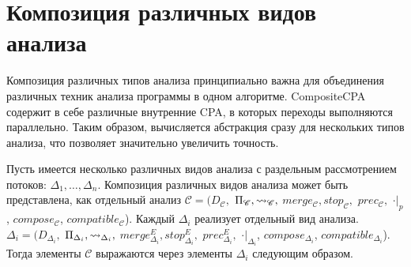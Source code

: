 \section{Композиция различных видов анализа}
\label{sect_ccc_analysis}

Композиция различных типов анализа принципиально важна для объединения различных техник анализа программы в одном алгоритме.
CompositeCPA содержит в себе различные внутренние CPA, в которых переходы выполняются параллельно.
Таким образом, вычисляется абстракция сразу для нескольких типов анализа, что позволяет значительно увеличить точность.

Пусть имеется несколько различных видов анализа с раздельным рассмотрением потоков: $\Delta_1, \dots, \Delta_n$. 
Композиция различных видов анализа может быть представлена, как отдельный анализ $\mathscr{C}=(D_{\mathscr{C}},$ $\Pi_{\mathscr{C}}, \leadsto_{\mathscr{C}},$ $merge_{\mathscr{C}}, stop_{\mathscr{C}},$ $prec_{\mathscr{C}},$ $\cdot|_p$, $compose_{\mathscr{C}}$, $compatible_{\mathscr{C}}$).
Каждый $\Delta_i$ реализует отдельный вид анализа. 
$\Delta_i=(D_{\Delta_i},$ $\Pi_{\Delta_i}, \leadsto_{\Delta_i},$ $merge^E_{\Delta_i}, stop^E_{\Delta_i},$ $prec^E_{\Delta_i},$ $\cdot|_{\Delta_i}$, $compose_{\Delta_i}$, $compatible_{\Delta_i}$). 
Тогда элементы $\mathscr{C}$ выражаются через элементы $\Delta_i$ следующим образом.

